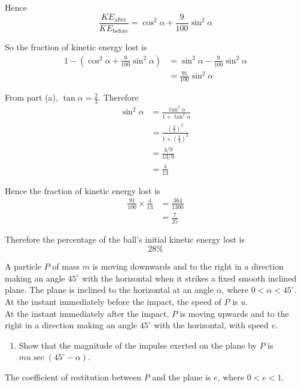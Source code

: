 \documentclass[leqno]{article}
\begin{document}
\begin{enumerate}[
  label=\textbf{\arabic*.},
  leftmargin=*,
  topsep=0pt,
  partopsep=0pt,
  parsep=0pt
]
\begin{djsSolution}
\begin{enumerate}[label=\textbf{(\alph*)}]
  Hence
  \[
  \frac{KE_{\text{after}}}{KE_{\text{before}}}
  = \cos^2\alpha+\frac9{100}\sin^2\alpha
  \]

  So the fraction of kinetic energy lost is
  \begin{align*}
  1-\left(\cos^2\alpha+\frac9{100}\sin^2\alpha\right)
  &= \sin^2\alpha-\frac9{100}\sin^2\alpha \\
  &= \frac{91}{100}\sin^2\alpha
  \end{align*}

  From part (a), \(\tan\alpha=\frac23\). Therefore
  \begin{align*}
  \sin^2\alpha
  &= \frac{\tan^2\alpha}{1+\tan^2\alpha} \\
  &= \frac{\left(\frac23\right)^2}{1+\left(\frac23\right)^2} \\
  &= \frac{4/9}{13/9} \\
  &= \frac4{13}
  \end{align*}

  Hence the fraction of kinetic energy lost is
  \begin{align*}
  \frac{91}{100}\times\frac4{13}
  &= \frac{364}{1300} \\
  &= \frac7{25}
  \end{align*}

  Therefore the percentage of the ball's initial kinetic energy lost is
  \[
  28\%
  \]
\end{enumerate}
\end{djsSolution}


\newpage

\questionitem

A particle $P$ of mass $m$ is moving downwards and to the right in a direction making an angle $45^\circ$ with the horizontal when it strikes a fixed smooth inclined plane. The plane is inclined to the horizontal at an angle $\alpha$, where $0<\alpha<45^\circ$. \\

At the instant immediately before the impact, the speed of $P$ is $u$. \\

At the instant immediately after the impact, $P$ is moving upwards and to the right in a direction making an angle $45^\circ$ with the horizontal, with speed $v$. \\

\begin{enumerate}[label=\textbf{(\alph*)}]
  \item Show that the magnitude of the impulse exerted on the plane by $P$ is $mu \sec(45^\circ-\alpha)$.  \\
\end{enumerate}
The coefficient of restitution between $P$ and the plane is $e$, where $0<e<1$. \\


\end{enumerate}
\end{document}
